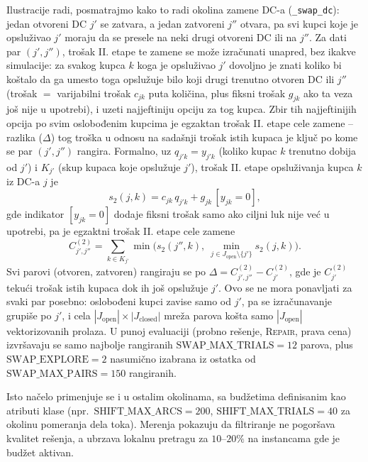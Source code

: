 \documentclass[12pt,a4paper]{article}
\begin{document}
Ilustracije radi, posmatrajmo kako to radi okolina zamene DC-a
(\texttt{\_swap\_dc}): jedan otvoreni DC $j'$ se zatvara, a jedan zatvoreni
$j''$ otvara, pa svi kupci koje je opsluživao $j'$ moraju da se presele na
neki drugi otvoreni DC ili na $j''$. Za dati par $(j', j'')$, trošak II.
etape te zamene se može izračunati unapred, bez ikakve simulacije: za
svakog kupca $k$ koga je opsluživao $j'$ dovoljno je znati koliko bi koštalo
da ga umesto toga opslužuje bilo koji drugi trenutno otvoren DC ili $j''$
(trošak $= $ varijabilni trošak $c_{jk}$ puta količina, plus fiksni trošak
$g_{jk}$ ako ta veza još nije u upotrebi), i uzeti najjeftiniju opciju za tog
kupca. Zbir tih najjeftinijih opcija po svim oslobođenim kupcima je egzaktan
trošak II. etape cele zamene -- razlika ($\Delta$) tog troška u odnosu na
sadašnji trošak istih kupaca je ključ po kome se par $(j', j'')$ rangira.
Formalno, uz $q_{j'k} = y_{j'k}$ (koliko kupac $k$ trenutno dobija od $j'$) i
$K_{j'}$ (skup kupaca koje opslužuje $j'$), trošak II. etape opsluživanja
kupca $k$ iz DC-a $j$ je
\begin{equation} \label{eq:stage2}
s_2(j,k) = c_{jk}\, q_{j'k} + g_{jk}\,[y_{jk} = 0],
\end{equation}
gde indikator $[y_{jk} = 0]$ dodaje fiksni trošak samo ako ciljni luk nije
već u upotrebi, pa je egzaktni trošak II. etape cele zamene
\begin{equation} \label{eq:swapdelta}
C^{(2)}_{j',j''} = \sum_{k \in K_{j'}}
\min\Big( s_2(j'',k),\ \min_{j \in J_{\text{open}} \setminus \{j'\}} s_2(j,k) \Big).
\end{equation}
Svi parovi (otvoren, zatvoren) rangiraju se po $\Delta = C^{(2)}_{j',j''} -
C^{(2)}_{j'}$, gde je $C^{(2)}_{j'}$ tekući trošak istih kupaca dok ih još
opslužuje $j'$. Ovo se ne mora ponavljati za svaki par posebno: oslobođeni
kupci zavise samo od $j'$, pa se izračunavanje grupiše po $j'$, i cela
$|J_{\text{open}}| \times |J_{\text{closed}}|$ mreža parova košta samo
$|J_{\text{open}}|$ vektorizovanih prolaza. U punoj evaluaciji (probno
rešenje, \textsc{Repair}, prava cena) izvršavaju se samo najbolje rangiranih
$\text{SWAP\_MAX\_TRIALS} = 12$ parova, plus $\text{SWAP\_EXPLORE} = 2$
nasumično izabrana iz ostatka od $\text{SWAP\_MAX\_PAIRS} = 150$ rangiranih.

Isto načelo primenjuje se i u ostalim okolinama, sa budžetima definisanim kao
atributi klase (npr.\ $\text{SHIFT\_MAX\_ARCS} = 200$,
$\text{SHIFT\_MAX\_TRIALS} = 40$ za okolinu pomeranja dela toka). Merenja
pokazuju da filtriranje ne pogoršava kvalitet rešenja, a ubrzava lokalnu
pretragu za $10$--$20\%$ na instancama gde je budžet aktivan.
\end{document}
